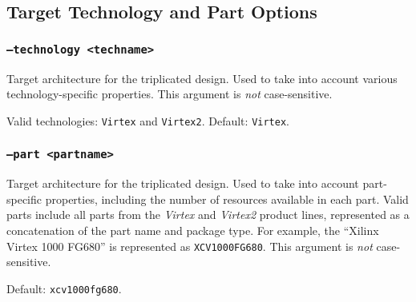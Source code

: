 \subsection{Target Technology and Part Options}

\subsubsection{\texttt{--technology <techname>}}
Target architecture for the triplicated design. Used to take into account 
various technology-specific properties. This argument is \emph{not} 
case-sensitive.

Valid technologies: \texttt{Virtex} and \texttt{Virtex2}. Default: 
\texttt{Virtex}.

\subsubsection{\texttt{--part <partname>}}
Target architecture for the triplicated design. Used to take into account 
part-specific properties, including the number of resources available 
in each part. Valid parts include all parts from the \emph{Virtex} and 
\emph{Virtex2} product lines, represented as a concatenation of the part name 
and package type. For example, the ``Xilinx Virtex 1000 FG680'' is represented 
as \texttt{XCV1000FG680}. This argument is \emph{not} case-sensitive.

Default: \texttt{xcv1000fg680}.
